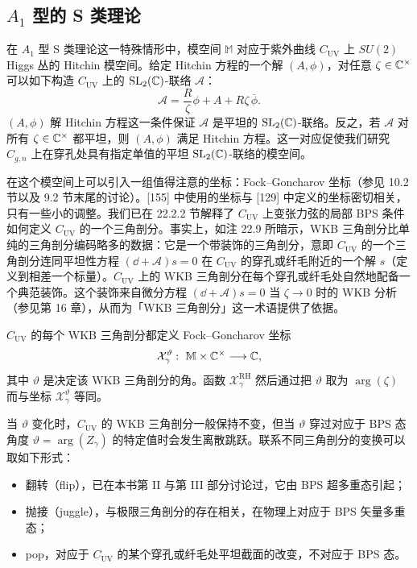 \subsection{$A_1$ 型的 S 类理论}

在 $A_1$ 型 S 类理论这一特殊情形中，模空间 $\mathbb{M}$ 对应于紫外曲线 $C_{\mathrm{UV}}$ 上 $SU(2)$ Higgs 丛的 Hitchin 模空间。给定 Hitchin 方程的一个解 $(A,\phi)$，对任意 $\zeta\in\mathbb{C}^\times$ 可以如下构造 $C_{\mathrm{UV}}$ 上的 $\operatorname{SL}_2(\mathbb{C})$-联络 $\mathcal{A}$：
\[
\mathcal{A}=\frac{R}{\zeta}\phi+A+R\zeta\,\overline{\phi}.
\]
$(A,\phi)$ 解 Hitchin 方程这一条件保证 $\mathcal{A}$ 是平坦的 $\operatorname{SL}_2(\mathbb{C})$-联络。反之，若 $\mathcal{A}$ 对所有 $\zeta\in\mathbb{C}^\times$ 都平坦，则 $(A,\phi)$ 满足 Hitchin 方程。这一对应促使我们研究 $C_{g,n}$ 上在穿孔处具有指定单值的平坦 $\operatorname{SL}_2(\mathbb{C})$-联络的模空间。

在这个模空间上可以引入一组值得注意的坐标：Fock–Goncharov 坐标（参见 10.2 节以及 9.2 节末尾的讨论）。[155] 中使用的坐标与 [129] 中定义的坐标密切相关，只有一些小的调整。我们已在 22.2.2 节解释了 $C_{\mathrm{UV}}$ 上变张力弦的局部 BPS 条件如何定义 $C_{\mathrm{UV}}$ 的一个三角剖分。事实上，如注 22.9 所暗示，WKB 三角剖分比单纯的三角剖分编码略多的数据：它是一个带装饰的三角剖分，意即 $C_{\mathrm{UV}}$ 的一个三角剖分连同平坦性方程 $(\dd+\mathcal{A})s=0$ 在 $C_{\mathrm{UV}}$ 的穿孔或纤毛附近的一个解 $s$（定义到相差一个标量）。$C_{\mathrm{UV}}$ 上的 WKB 三角剖分在每个穿孔或纤毛处自然地配备一个典范装饰。这个装饰来自微分方程 $(\dd+\mathcal{A})s=0$ 当 $\zeta\to0$ 时的 WKB 分析（参见第 16 章），从而为「WKB 三角剖分」这一术语提供了依据。

$C_{\mathrm{UV}}$ 的每个 WKB 三角剖分都定义 Fock–Goncharov 坐标
\[
\mathcal{X}^\vartheta_\gamma:\ \mathbb{M}\times\C^\times\longrightarrow\C,
\]
其中 $\vartheta$ 是决定该 WKB 三角剖分的角。函数 $\mathcal{X}^{\mathrm{RH}}_\gamma$ 然后通过把 $\vartheta$ 取为 $\arg(\zeta)$ 而与坐标 $\mathcal{X}^\vartheta_\gamma$ 等同。

当 $\vartheta$ 变化时，$C_{\mathrm{UV}}$ 的 WKB 三角剖分一般保持不变，但当 $\vartheta$ 穿过对应于 BPS 态角度 $\vartheta=\arg(Z_\gamma)$ 的特定值时会发生离散跳跃。联系不同三角剖分的变换可以取如下形式：
\begin{itemize}
\item 翻转（flip），已在本书第 II 与第 III 部分讨论过，它由 BPS 超多重态引起；
\item 抛接（juggle），与极限三角剖分的存在相关，在物理上对应于 BPS 矢量多重态；
\item pop，对应于 $C_{\mathrm{UV}}$ 的某个穿孔或纤毛处平坦截面的改变，不对应于 BPS 态。
\end{itemize}

